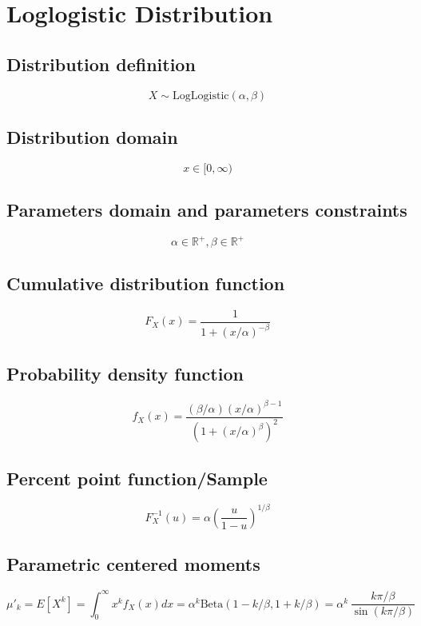 \documentclass{article}
\begin{document}
\newpage
\section{Loglogistic Distribution}
\subsection{Distribution definition}
\begin{equation*} X\sim\mathrm{LogLogistic}\left(\alpha,\beta\right) \end{equation*}
\subsection{Distribution domain}
\begin{equation*} x\in [0,\infty) \end{equation*}
\subsection{Parameters domain and parameters constraints}
\begin{equation*} \alpha\in\mathbb{R}^{+}, \beta\in\mathbb{R}^{+} \end{equation*}
\subsection{Cumulative distribution function}
\begin{equation*} F_{X}\left(x\right)=\frac{1}{1+(x/\alpha)^{-\beta}} \end{equation*}
\subsection{Probability density function}
\begin{equation*} f_{X}\left(x\right)=\frac{ (\beta/\alpha)(x/\alpha)^{\beta-1} }{ \left (1+(x/\alpha)^{\beta}\right)^2  } \end{equation*}
\subsection{Percent point function/Sample}
\begin{equation*} F^{-1}_{X}\left(u\right)=\alpha\left(\frac{u}{1-u}\right)^{1/\beta} \end{equation*}
\subsection{Parametric centered moments}
\begin{equation*} \mu'_{k}=E[X^k]=\int_{0}^{\infty}x^{k}f_{X}\left(x\right)dx=\alpha^k \text{Beta}(1-k/\beta,1+k/\beta)=\alpha^k\,\frac{k\pi/\beta}{\sin(k\pi/\beta)} \end{equation*}
\end{document}
